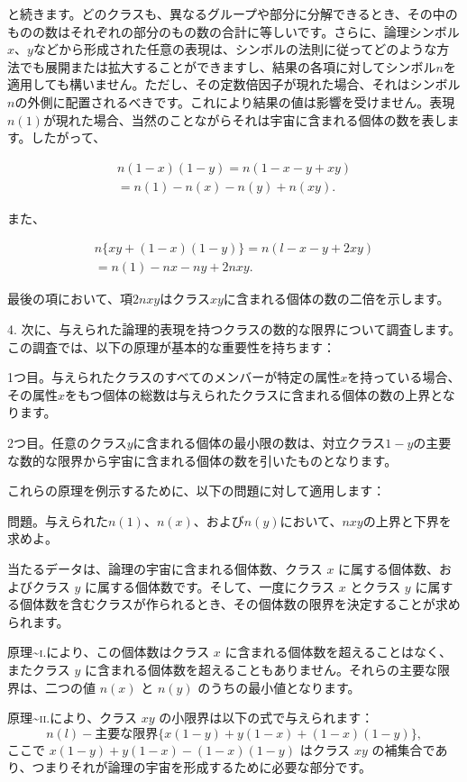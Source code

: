 \documentclass[a4paper,11pt,openany]{ltjsbook}
\begin{document}
と続きます。どのクラスも、異なるグループや部分に分解できるとき、その中のものの数はそれぞれの部分のもの数の合計に等しいです。さらに、論理シンボル$x$、$y$などから形成された任意の表現は、シンボルの法則に従ってどのような方法でも展開または拡大することができますし、結果の各項に対してシンボル$n$を適用しても構いません。ただし、その定数倍因子が現れた場合、それはシンボル$n$の外側に配置されるべきです。これにより結果の値は影響を受けません。表現$n(1)$が現れた場合、当然のことながらそれは宇宙に含まれる個体の数を表します。したがって、

\begin{gather*}
n(1-x)(1-y) = n(1-x-y+xy)\\
= n(1) - n(x) - n(y) + n(xy).
\end{gather*}

また、

\begin{gather*}
n\{xy + (1-x)(1-y)\} = n(l-x-y+2xy) \\
= n(1) - nx - ny + 2nxy.
\end{gather*}

最後の項において、項$2nxy$はクラス$xy$に含まれる個体の数の二倍を示します。

4. 次に、与えられた論理的表現を持つクラスの数的な限界について調査します。この調査では、以下の原理が基本的な重要性を持ちます：

1つ目。与えられたクラスのすべてのメンバーが特定の属性$x$を持っている場合、その属性$x$をもつ個体の総数は与えられたクラスに含まれる個体の数の上界となります。

2つ目。任意のクラス$y$に含まれる個体の最小限の数は、対立クラス$1-y$の主要な数的な限界から宇宙に含まれる個体の数を引いたものとなります。

これらの原理を例示するために、以下の問題に対して適用します：

\textsc{問題}。与えられた$n(1)$、$n(x)$、および$n(y)$において、$nxy$の上界と下界を求めよ。

当たるデータは、論理の宇宙に含まれる個体数、クラス \( x \) に属する個体数、およびクラス \( y \) に属する個体数です。そして、一度にクラス \( x \) とクラス \( y \) に属する個体数を含むクラスが作られるとき、その個体数の限界を決定することが求められます。

原理\textasciitilde{}\textsc{i.}により、この個体数はクラス \( x \) に含まれる個体数を超えることはなく、またクラス \( y \) に含まれる個体数を超えることもありません。それらの主要な限界は、二つの値 \( n(x) \) と \( n(y) \) のうちの最小値となります。

原理\textasciitilde{}\textsc{ii.}により、クラス \( xy \) の小限界は以下の式で与えられます：
\[
n(l) - \text{主要な限界}\{x(1-y) + y(1-x) + (1-x)(1-y)\}, \tag{1}
\]
ここで \( x(1-y) + y(1-x) - (1-x)(1-y) \) はクラス \( xy \) の補集合であり、つまりそれが論理の宇宙を形成するために必要な部分です。
\end{document}
